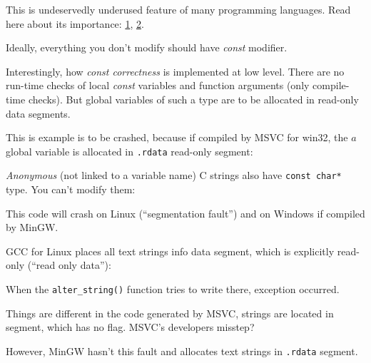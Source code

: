 \label{const_in_rdata}

This is undeservedly underused feature of many programming languages.
Read here about its importance:
\href{https://isocpp.org/wiki/faq/const-correctness}{1},
\href{https://stackoverflow.com/questions/136880/sell-me-on-const-correctness}{2}.

Ideally, everything you don't modify should have \emph{const} modifier.

Interestingly, how \emph{const correctness} is implemented at low level.
There are no run-time checks of local \emph{const} variables and function arguments (only compile-time checks).
But global variables of such a type are to be allocated in read-only data segments.

This is example is to be crashed, because if compiled by MSVC for win32,
the $a$ global variable is allocated in \verb|.rdata| read-only segment:



\emph{Anonymous} (not linked to a variable name) C strings also have \verb|const char*| type.
You can't modify them:



This code will crash on Linux (``segmentation fault'') and on Windows if compiled by MinGW.

GCC for Linux places all text strings info  data segment, which is explicitly read-only
(``read only data''):



When the \verb|alter_string()| function tries to write there, exception occurred.

Things are different in the code generated by MSVC, strings are located in  segment, which has no  flag.
MSVC's developers misstep?



However, MinGW hasn't this fault and allocates text strings in \verb|.rdata| segment.



